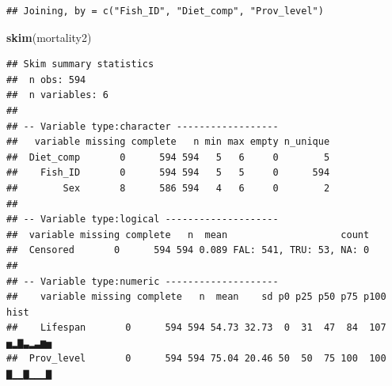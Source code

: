\documentclass[]{book}
\newenvironment{Shaded}{\begin{snugshade}}{\end{snugshade}}
\newcommand{\DataTypeTok}[1]{\textcolor[rgb]{0.13,0.29,0.53}{#1}}
\newcommand{\DecValTok}[1]{\textcolor[rgb]{0.00,0.00,0.81}{#1}}
\newcommand{\KeywordTok}[1]{\textcolor[rgb]{0.13,0.29,0.53}{\textbf{#1}}}
\newcommand{\NormalTok}[1]{#1}
\newcommand{\OperatorTok}[1]{\textcolor[rgb]{0.81,0.36,0.00}{\textbf{#1}}}
\newcommand{\OtherTok}[1]{\textcolor[rgb]{0.56,0.35,0.01}{#1}}
\newcommand{\StringTok}[1]{\textcolor[rgb]{0.31,0.60,0.02}{#1}}
\begin{document}
\begin{Shaded}
\end{Shaded}

\begin{verbatim}
## Joining, by = c("Fish_ID", "Diet_comp", "Prov_level")
\end{verbatim}

\begin{Shaded}
\begin{Highlighting}[]
\KeywordTok{skim}\NormalTok{(mortality2)}
\end{Highlighting}
\end{Shaded}

\begin{verbatim}
## Skim summary statistics
##  n obs: 594 
##  n variables: 6 
## 
## -- Variable type:character ------------------
##   variable missing complete   n min max empty n_unique
##  Diet_comp       0      594 594   5   6     0        5
##    Fish_ID       0      594 594   5   5     0      594
##        Sex       8      586 594   4   6     0        2
## 
## -- Variable type:logical --------------------
##  variable missing complete   n  mean                    count
##  Censored       0      594 594 0.089 FAL: 541, TRU: 53, NA: 0
## 
## -- Variable type:numeric --------------------
##    variable missing complete   n  mean    sd p0 p25 p50 p75 p100     hist
##    Lifespan       0      594 594 54.73 32.73  0  31  47  84  107 ▅▂▇▃▂▃▆▅
##  Prov_level       0      594 594 75.04 20.46 50  50  75 100  100 ▇▁▁▇▁▁▁▇
\end{verbatim}
\end{document}
